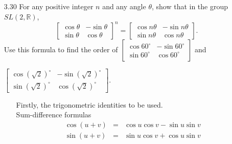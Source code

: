\documentclass[12pt]{article}
\begin{document}
\begin{enumerate}
\item[3.30] For any positive integer $n$ and any angle $\theta$, show that in the group
$SL(2, \mathbb{R})$,
\[
\left[ \begin{array}{cc} \cos \theta & -\sin \theta \\ \sin \theta & \cos \theta \end{array} \right]^n =
\left[ \begin{array}{cc} \cos n\theta & -\sin n\theta \\ \sin n\theta & \cos n\theta \end{array} \right].
\]
Use this formula to find the order of 
$\left[ \begin{array}{cc} \cos 60^\circ & -\sin 60^\circ \\
\sin 60^\circ & \cos 60^\circ \end{array} \right]$ and

$\left[ \begin{array}{cc} \cos (\sqrt{2})^\circ & -\sin (\sqrt{2})^\circ \\
\sin (\sqrt{2})^\circ & \cos (\sqrt{2})^\circ \end{array} \right]$.
\begin{enumerate}
\item[] Firstly, the trigonometric identities to be used. \\
Sum-difference formulas
\begin{eqnarray}
\cos (u + v) &=& \cos u \cos v - \sin u \sin v \\
\sin (u + v) &=& \sin u \cos v + \cos u \sin v
\end{eqnarray}


\end{enumerate}
\end{enumerate}
\end{document}

